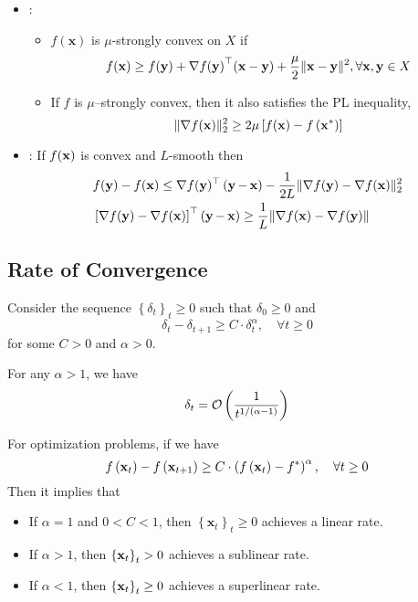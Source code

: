 \begin{itemize}[leftmargin=*]
\begin{itemize}[leftmargin=*]
        \item {}.
    \end{itemize}

    \item {}: 
    \begin{itemize}[leftmargin=*]
        \item $f(\mathbf{x})$ is $\mu$-strongly convex on $X$ if 
$$
f(\mathbf{x}) \geq f(\mathbf{y})+\nabla{f(\operatorname{\boldsymbol{\mathbf{y}}})}^{\top}(\mathbf{x}-\mathbf{y})+\frac{\mu}{2}\|\mathbf{x}-\mathbf{y}\|^{2}, \forall \mathbf{x}, \mathbf{y} \in X
$$
        \item If $f$ is $\mu$–strongly convex, then it also satisfies the PL inequality,
        $$\|\nabla f(\operatorname{\boldsymbol{\mathbf{x}}})\|_{2}^{2} \geq 2 \mu\left[f(\operatorname{\boldsymbol{\mathbf{x}}})-f\left(\operatorname{\boldsymbol{\mathbf{x}}}^{*}\right)\right]$$
    \end{itemize}
    
    
        \item {}: If $f(\operatorname{\boldsymbol{\mathbf{x}}})$ is convex and $L$-smooth then
$$
\begin{aligned}
&f(\operatorname{\boldsymbol{\mathbf{y}}})-f(\operatorname{\boldsymbol{\mathbf{x}}})  \leq \nabla f(\operatorname{\boldsymbol{\mathbf{y}}})^\top \left( \operatorname{\boldsymbol{\mathbf{y}}}-\operatorname{\boldsymbol{\mathbf{x}}} \right)-\frac{1}{2 L}\|\nabla f(\operatorname{\boldsymbol{\mathbf{y}}})-\nabla f(\operatorname{\boldsymbol{\mathbf{x}}})\|_{2}^{2} \\
& \left[\nabla f(\operatorname{\boldsymbol{\mathbf{y}}})-\nabla f(\operatorname{\boldsymbol{\mathbf{x}}})\right]^\top \left(\operatorname{\boldsymbol{\mathbf{y}}}-\operatorname{\boldsymbol{\mathbf{x}}}\right)  \geq \frac{1}{L}\|\nabla f(\operatorname{\boldsymbol{\mathbf{x}}})-\nabla f(\operatorname{\boldsymbol{\mathbf{y}}})\|
\end{aligned}
$$

    
\end{itemize}








\subsection*{Rate of Convergence}
Consider the sequence $\left\{\delta_{t}\right\}_{t} \geq 0$ such that $\delta_{0} \geq 0$ and
$$
\delta_{t}-\delta_{t+1} \geq C \cdot \delta_{t}^{\alpha}, \quad \forall t \geq 0
$$
for some $C>0$ and $\alpha>0$.

For any $\alpha>1$, we have
$$
\delta_{t}=\operatorname{\mathcal{O}}\left(\frac{1}{t^{1 /(\alpha-1)}}\right)
$$

For optimization problems, if we have
$$
f\left(\operatorname{\boldsymbol{\mathbf{x}}}_{t}\right)-f\left(\operatorname{\boldsymbol{\mathbf{x}}}_{t+1}\right) \geq C \cdot\left(f\left(\operatorname{\boldsymbol{\mathbf{x}}}_{t}\right)-f^{*}\right)^{\alpha}, \quad \forall t \geq 0
$$
Then it implies that
\begin{itemize}[leftmargin=*]
    \item If $\alpha=1$ and $0<C<1$, then     
$\left\{\mathbf{x}_{{t}}\right\}_{{t}} \geq 0$ achieves a linear rate.
    \item If $\alpha>1$, then $\left\{\operatorname{\boldsymbol{\mathbf{x}}}_{t}\right\}_{t}>0$ achieves a sublinear rate.
    \item If $\alpha<1$, then $\left\{\operatorname{\boldsymbol{\mathbf{x}}}_{t}\right\}_{t} \geq 0$ achieves a superlinear rate.
\end{itemize}





